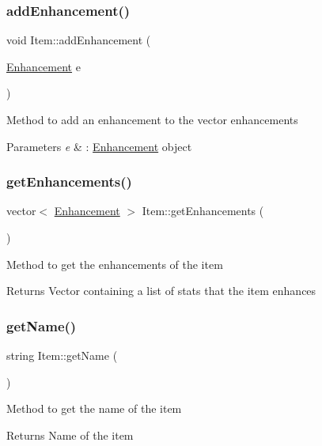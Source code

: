 \subsubsection{\texorpdfstring{add\+Enhancement()}{addEnhancement()}}
{\footnotesize\ttfamily void Item\+::add\+Enhancement (\begin{DoxyParamCaption}\item[{\hyperlink{class_enhancement}{Enhancement}}]{e }\end{DoxyParamCaption})}

Method to add an enhancement to the vector enhancements 
\begin{DoxyParams}{Parameters}
{\em e} & \+: \hyperlink{class_enhancement}{Enhancement} object \\
\hline
\end{DoxyParams}
\hypertarget{class_item_abf06eb8a8f73633c4c7c922073a754b8}{}\label{class_item_abf06eb8a8f73633c4c7c922073a754b8} 
\subsubsection{\texorpdfstring{get\+Enhancements()}{getEnhancements()}}
{\footnotesize\ttfamily vector$<$ \hyperlink{class_enhancement}{Enhancement} $>$ Item\+::get\+Enhancements (\begin{DoxyParamCaption}{ }\end{DoxyParamCaption})}

Method to get the enhancements of the item \begin{DoxyReturn}{Returns}
Vector containing a list of stats that the item enhances 
\end{DoxyReturn}
\hypertarget{class_item_a63d7f2148b699e539aae354b01559811}{}\label{class_item_a63d7f2148b699e539aae354b01559811} 
\subsubsection{\texorpdfstring{get\+Name()}{getName()}}
{\footnotesize\ttfamily string Item\+::get\+Name (\begin{DoxyParamCaption}{ }\end{DoxyParamCaption})}

Method to get the name of the item \begin{DoxyReturn}{Returns}
Name of the item 
\end{DoxyReturn}
\hypertarget{class_item_a2aea1cc560205b01eaf5250c21f4fc71}{}\label{class_item_a2aea1cc560205b01eaf5250c21f4fc71} 
